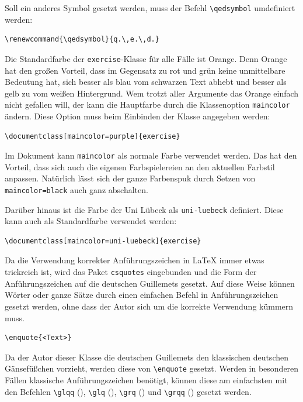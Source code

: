 \documentclass{exercise}
\begin{document}
    Soll ein anderes Symbol gesetzt werden, muss der Befehl \lstinline-\qedsymbol- umdefiniert werden:
    \begin{lstlisting}[gobble=6]
      \renewcommand{\qedsymbol}{q.\,e.\,d.}
    \end{lstlisting}

  \label{section-farbe}
    Die Standardfarbe der \texttt{exercise}-Klasse für alle Fälle ist Orange. Denn Orange hat den großen Vorteil, dass im Gegensatz zu rot und grün keine unmittelbare Bedeutung hat, sich besser als blau vom schwarzen Text abhebt und besser als gelb zu vom weißen Hintergrund. Wem trotzt aller Argumente das Orange einfach nicht gefallen will, der kann die Hauptfarbe durch die Klassenoption \lstinline{maincolor} ändern. Diese Option muss beim Einbinden der Klasse angegeben werden:
    \begin{lstlisting}[gobble=6]
      \documentclass[maincolor=purple]{exercise}
    \end{lstlisting}

    Im Dokument kann \lstinline{maincolor} als normale Farbe verwendet werden. Das hat den Vorteil, dass sich auch die eigenen Farbspielereien an den aktuellen Farbstil anpassen. Natürlich lässt sich der ganze Farbenspuk durch Setzen von \lstinline{maincolor=black} auch ganz abschalten.

    Darüber hinaus ist die Farbe der Uni Lübeck als \lstinline{uni-luebeck} definiert. Diese kann auch als Standardfarbe verwendet werden:
    \begin{lstlisting}[gobble=6]
      \documentclass[maincolor=uni-luebeck]{exercise}
    \end{lstlisting}

    Da die Verwendung korrekter Anführungszeichen in \LaTeX{} immer etwas trickreich ist, wird das Paket \texttt{csquotes} \cite{csquotes} eingebunden und die Form der Anführungszeichen auf die deutschen Guillemets gesetzt. Auf diese Weise können Wörter oder ganze Sätze durch einen einfachen Befehl in Anführungszeichen gesetzt werden, ohne dass der Autor sich um die korrekte Verwendung kümmern muss.
    \begin{lstlisting}[gobble=6]
      \enquote{<Text>}
    \end{lstlisting}

    Da der Autor dieser Klasse die deutschen Guillemets den klassischen deutschen Gänsefüßchen vorzieht, werden diese von \lstinline-\enquote- gesetzt. Werden in besonderen Fällen klassische Anführungszeichen benötigt, können diese am einfachsten mit den Befehlen \lstinline-\glqq- (\glqq), \lstinline-\glq- (\glq), \lstinline-\grq- (\grq) und \lstinline-\grqq- (\grqq) gesetzt werden.
\end{document}

